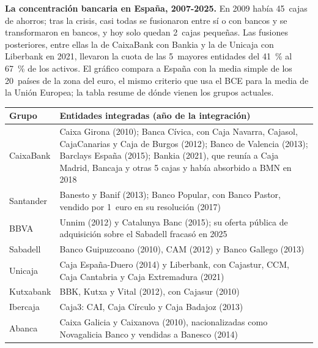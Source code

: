 \documentclass[11pt]{article}
\begin{document}
\begin{anotaciones}
\textbf{La concentración bancaria en España, 2007-2025.} En 2009 había 45~cajas de ahorros; tras la crisis, casi todas se fusionaron entre sí o con bancos y se transformaron en bancos, y hoy solo quedan 2~cajas pequeñas. Las fusiones posteriores, entre ellas la de CaixaBank con Bankia y la de Unicaja con Liberbank en 2021, llevaron la cuota de las 5~mayores entidades del 41~\% al 67~\% de los activos. El gráfico compara a España con la media simple de los 20~países de la zona del euro, el mismo criterio que usa el BCE para la media de la Unión Europea; la tabla resume de dónde vienen los grupos actuales.

\begin{figuracaja}
\caption{Concentración bancaria en España y en la zona del euro, 1999-2025}\label{fig:concentracion}
\end{figuracaja}

\begin{tablacaja}
\caption{De dónde vienen los grandes grupos bancarios españoles, 2007-2025}\label{tab:fusiones}
\footnotesize
\begin{tabular}{>{\raggedright\arraybackslash}p{2.4cm}|>{\raggedright\arraybackslash}p{12.2cm}}
\rowcolor{tceeazulpalido}\textbf{Grupo} & \textbf{Entidades integradas (año de la integración)}\\ \hline
CaixaBank & Caixa Girona (2010); Banca Cívica, con Caja Navarra, Cajasol, CajaCanarias y Caja de Burgos (2012); Banco de Valencia (2013); Barclays España (2015); Bankia (2021), que reunía a Caja Madrid, Bancaja y otras 5 cajas y había absorbido a BMN en 2018\\ \hline
Santander & Banesto y Banif (2013); Banco Popular, con Banco Pastor, vendido por 1~euro en su resolución (2017)\\ \hline
BBVA & Unnim (2012) y Catalunya Banc (2015); su oferta pública de adquisición sobre el Sabadell fracasó en 2025\\ \hline
Sabadell & Banco Guipuzcoano (2010), CAM (2012) y Banco Gallego (2013)\\ \hline
Unicaja & Caja España-Duero (2014) y Liberbank, con Cajastur, CCM, Caja Cantabria y Caja Extremadura (2021)\\ \hline
Kutxabank & BBK, Kutxa y Vital (2012), con Cajasur (2010)\\ \hline
Ibercaja & Caja3: CAI, Caja Círculo y Caja Badajoz (2013)\\ \hline
Abanca & Caixa Galicia y Caixanova (2010), nacionalizadas como Novagalicia Banco y vendidas a Banesco (2014)\\
\end{tabular}
\end{tablacaja}
\end{anotaciones}
\end{document}
